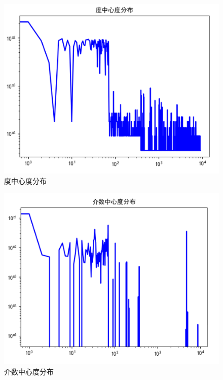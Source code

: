 \begin{figure}[h]
	\centering
	\includegraphics[scale=0.5]{figures/11.png}
	\caption{度中心度分布}
	\label{fig:1}
\end{figure}

\begin{figure}[h]
	\centering
	\includegraphics[scale=0.5]{figures/12.png}
	\caption{介数中心度分布}
	\label{fig:1}
\end{figure}


